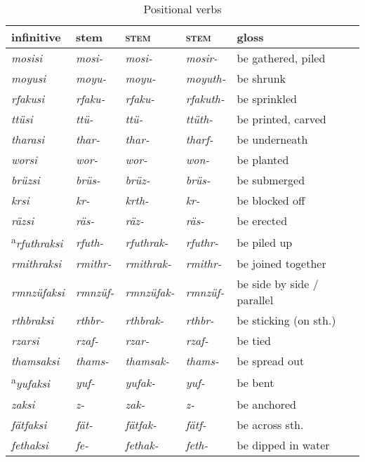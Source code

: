 \begin{table}
\caption{Positional verbs}
\label{positional.verbs}
{\small%
\begin{tabularx}{\textwidth}{lXXXl}
	\lsptoprule
	{infinitive} & \Pos{} {stem} & \Ext{} \textsc{stem} 	& \Rs{} \textsc{stem} 	& {gloss} \\\midrule
	\emph{mosisi} &\emph{mosi-} &\emph{mosi-} &\emph{mosir-} &be gathered, piled\\
	\emph{moyusi} &\emph{moyu-} &\emph{moyu-} &\emph{moyuth-} &be shrunk\\
	\emph{rfakusi} &\emph{rfaku-} &\emph{rfaku-} &\emph{rfakuth-} &be sprinkled\\
	\emph{ttüsi} &\emph{ttü-} &\emph{ttü-} &\emph{ttüth-} &be printed, carved\\
	\emph{tharasi} &\emph{thar-} &\emph{thar-} &\emph{tharf-} &be underneath\\
	\emph{worsi} &\emph{wor-} &\emph{wor-} &\emph{won-} &be planted\\\midrule
	\emph{brüzsi} &\emph{brüs-} &\emph{brüz-} &\emph{brüs-} &be submerged\\
	\emph{krsi} &\emph{kr-} &\emph{krth-} &\emph{kr-} &be blocked off\\
	\emph{räzsi} &\emph{räs-} &\emph{räz-} &\emph{räs-} &be erected\\
	\textsuperscript{a}\emph{rfuthraksi} &\emph{rfuth-} &\emph{rfuthrak-} &\emph{rfuthr-} &be piled up\\
	\emph{rmithraksi} &\emph{rmithr-} &\emph{rmithrak-}	&\emph{rmithr-} &be joined together\\
	\emph{rmnzüfaksi} &\emph{rmnzüf-} &\emph{rmnzüfak-}	&\emph{rmnzüf-} &be side by side / parallel\\
	\emph{rthbraksi} &\emph{rthbr-} &\emph{rthbrak-} &\emph{rthbr-} &be sticking (on sth.)\\
	\emph{rzarsi} &\emph{rzaf-} &\emph{rzar-} &\emph{rzaf-} &be tied\\
	\emph{thamsaksi} &\emph{thams-} &\emph{thamsak-} &\emph{thams-} &be spread out\\
	\textsuperscript{a}\emph{yufaksi} &\emph{yuf-} &\emph{yufak-} &\emph{yuf-} &be bent\\
	\emph{zaksi} &\emph{z-} &\emph{zak-} &\emph{z-} &be anchored\\\midrule
	\emph{fätfaksi} &\emph{fät-} &\emph{fätfak-} &\emph{fätf-} &be across sth.\\
	\emph{fethaksi} &\emph{fe-} &\emph{fethak-} &\emph{feth-} &be dipped in water\\

\end{tabularx}}
\end{table}
